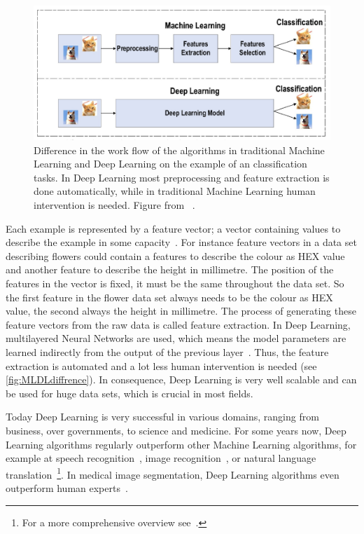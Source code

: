 \begin{figure}[!htb]
    \centering
    \includegraphics[width=\textwidth]{pictures/MLDLdiffrence}
    \caption[Work flow of learning algorithms]{Difference in the work flow of the algorithms in traditional Machine Learning and Deep Learning on the example of an classification tasks. In Deep Learning most preprocessing and feature extraction is done automatically, while in traditional Machine Learning human intervention is needed. Figure from ~\autocite{Alzubaidi2021}.}
    \label{fig:MLDLdiffrence}
\end{figure}
Each example is represented by a feature vector;
a vector containing values to describe the example in some capacity~\autocite{Burkov2019}.
For instance feature vectors in a data set describing flowers could contain a features to describe the colour as HEX value and another feature to describe the height in millimetre.
The position of the features in the vector is fixed, it must be the same throughout the data set.
So the first feature in the flower data set always needs to be the colour as HEX value, the second always the height in millimetre.
The process of generating these feature vectors from the raw data is called feature extraction.
In Deep Learning, multilayered Neural Networks are used, which means the model parameters are learned indirectly from the output of the previous layer~\autocite{LeCun2015}.
Thus, the feature extraction is automated and a lot less human intervention is needed (see \autoref{fig:MLDLdiffrence}).
In consequence, Deep Learning is very well scalable and can be used for huge data sets, which is crucial in most fields.

Today Deep Learning is very successful in various domains, ranging from business, over governments, to science and medicine\autocite{LeCun2015}.
For some years now, Deep Learning algorithms regularly outperform other Machine Learning algorithms, for example at speech recognition~\autocite[e.g.][]{Hinton2012}, image recognition~\autocite[e.g.][]{Krizhevsky2010}, or natural language translation~\autocite[e.g.][]{Sutskever2014}\footnote{For a more comprehensive overview see~\autocite{LeCun2015}.}.
In medical image segmentation, Deep Learning algorithms even outperform human experts~\autocite{Antonelli2021}.

